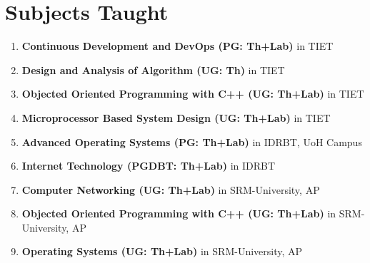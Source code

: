\documentclass{article}
\begin{document}
\section{Subjects Taught}	
	\begin{enumerate}
	 \item {\bf Continuous Development and DevOps (PG: Th+Lab)} in TIET
	 \item {\bf Design and Analysis of Algorithm (UG: Th)} in TIET
	 \item {\bf Objected Oriented Programming with C++ (UG: Th+Lab)} in TIET
	 \item {\bf Microprocessor Based System Design (UG: Th+Lab)} in TIET
	 \item {\bf Advanced Operating Systems (PG: Th+Lab)} in IDRBT, UoH Campus
	 \item {\bf Internet Technology (PGDBT: Th+Lab)} in IDRBT
	 \item {\bf Computer Networking (UG: Th+Lab)} in SRM-University, AP
	 \item {\bf Objected Oriented Programming with C++ (UG: Th+Lab)} in SRM-University, AP	 
	 \item {\bf Operating Systems (UG: Th+Lab)} in SRM-University, AP
	\end{enumerate}

\end{document}
